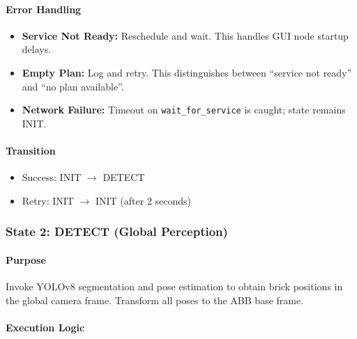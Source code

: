 \paragraph{Error Handling}

\begin{itemize}
    \item \textbf{Service Not Ready:} Reschedule and wait. This handles GUI node startup delays.
    \item \textbf{Empty Plan:} Log and retry. This distinguishes between ``service not ready'' and ``no plan available''.
    \item \textbf{Network Failure:} Timeout on \texttt{wait\_for\_service} is caught; state remains INIT.
\end{itemize}

\paragraph{Transition}

\begin{itemize}
    \item Success: INIT $\rightarrow$ DETECT
    \item Retry: INIT $\rightarrow$ INIT (after 2 seconds)
\end{itemize}

\subsubsection{State 2: DETECT (Global Perception)}
\label{state:detect}

\paragraph{Purpose}

Invoke YOLOv8 segmentation and pose estimation to obtain brick positions in the global camera frame. Transform all poses to the ABB base frame.

\paragraph{Execution Logic}

